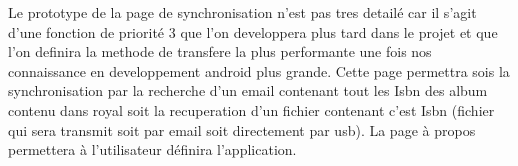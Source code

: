 \begin{figure}[htbp]
  \begin{center}
    \leavevmode
    \hspace{4cm}
  \end{center}
\end{figure}

Le prototype de la page de synchronisation n'est pas tres detailé car il s'agit d'une fonction de priorité 3 que l'on developpera plus tard dans le projet et que l'on definira la methode de transfere la plus performante une fois nos connaissance en developpement android plus grande. 
Cette page permettra sois la synchronisation par la recherche d'un email contenant tout les Isbn des album contenu dans royal soit la recuperation d'un fichier contenant c'est Isbn (fichier qui sera transmit soit par email soit directement par usb).
La page à propos permettera à l'utilisateur définira l'application.